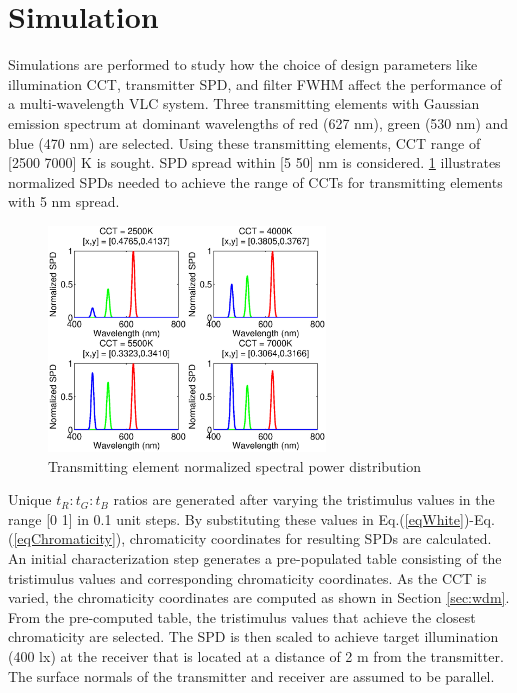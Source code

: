 \section{Simulation}\label{sec:simulation}
Simulations are performed to study how the choice of design parameters like illumination CCT, transmitter SPD, and filter FWHM affect the performance of a multi-wavelength VLC system. Three transmitting elements with Gaussian emission spectrum at dominant wavelengths of red (627 nm), green (530 nm) and blue (470 nm) are selected. Using these transmitting elements, CCT range of [2500 7000] K is sought. SPD spread within [5 50] nm is considered. \figurename{\ref{fig:LEDSPD}} illustrates normalized SPDs needed to achieve the range of CCTs for transmitting elements with 5 nm spread.

\begin{figure}[!b]
	\centering
		\includegraphics[trim={0.05in 0.05in 0.05in 0.0in}, clip=true, width=2.9in]{img/LEDSPD.eps}
	\caption{Transmitting element normalized spectral power distribution}
	\label{fig:LEDSPD}
\end{figure}

Unique $t_R:t_G:t_B$ ratios are generated after varying the tristimulus values in the range [0 1] in 0.1 unit steps. By substituting these values in Eq.(\ref{eqWhite})-Eq.(\ref{eqChromaticity}), chromaticity coordinates for resulting SPDs are calculated. An initial characterization step generates a pre-populated table consisting of the tristimulus values and corresponding chromaticity coordinates. As the CCT is varied, the chromaticity coordinates are computed as shown in Section \ref{sec:wdm}. From the pre-computed table, the tristimulus values that achieve the closest chromaticity are selected. The SPD is then scaled to achieve target illumination (400 lx) at the receiver that is located at a distance of 2 m from the transmitter. The surface normals of the transmitter and receiver are assumed to be parallel.

